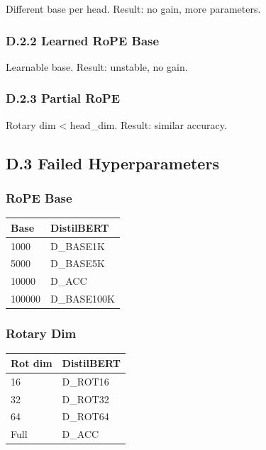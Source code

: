 Different base per head. Result: no gain, more parameters.

\subsubsection{D.2.2 Learned RoPE Base}

Learnable base. Result: unstable, no gain.

\subsubsection{D.2.3 Partial RoPE}

Rotary dim < head\_dim. Result: similar accuracy.

\subsection{D.3 Failed Hyperparameters}

\subsubsection{RoPE Base}

\begin{table}[H]
\centering
\small
\begin{tabular}{ll}
\toprule
\textbf{Base} & \textbf{DistilBERT} \\
\midrule
1000 & {{D\_BASE1K}} \\
5000 & {{D\_BASE5K}} \\
10000 & {{D\_ACC}} \\
100000 & {{D\_BASE100K}} \\
\bottomrule
\end{tabular}
\end{table}

\subsubsection{Rotary Dim}

\begin{table}[H]
\centering
\small
\begin{tabular}{ll}
\toprule
\textbf{Rot dim} & \textbf{DistilBERT} \\
\midrule
16 & {{D\_ROT16}} \\
32 & {{D\_ROT32}} \\
64 & {{D\_ROT64}} \\
Full & {{D\_ACC}} \\
\bottomrule
\end{tabular}
\end{table}

